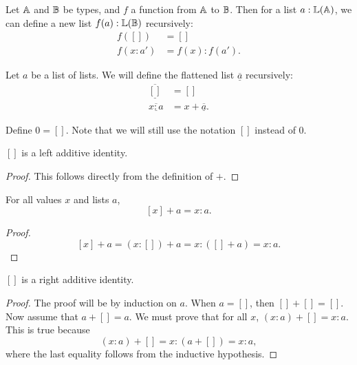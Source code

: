 \documentclass[../../math.tex]{subfiles}
\begin{document}
\begin{definition}
    Let $\mathbb{A}$ and $\mathbb{B}$ be types, and $f$ a function from $\mathbb{A}$ to $\mathbb{B}$.  Then for
    a list $a : \mathbb{L}(\mathbb{A})$, we can define a new list $f(a) : \mathbb{L}(\mathbb{B})$ recursively:
    \begin{align*}
            f([]) &= [] \\
        f(x : a') &= f(x) : f(a').
    \end{align*}
\end{definition}

\newcommand{\flatten}[1]{\underline{\overline{#1}}}
\begin{definition}
    Let $a$ be a list of lists.  We will define the flattened list $\flatten{a}$
    recursively:
    \begin{align*}
        \flatten{[]} &= [] \\
        \flatten{x : a} &= x + \flatten a.
    \end{align*}
\end{definition}

\begin{instance}
    Define $0 = []$.  Note that we will still use the notation $[]$ instead of
    $0$.
\end{instance}

\begin{instance}
    $[]$ is a left additive identity.
\end{instance}
\begin{proof}
    This follows directly from the definition of $+$.
\end{proof}

\begin{theorem}
    For all values $x$ and lists $a$,
    \[
        [x] + a = x : a.
    \]
\end{theorem}
\begin{proof}
    \[
        [x] + a = (x : []) + a = x : ([] + a) = x : a.
    \]
\end{proof}

\begin{instance}
    $[]$ is a right additive identity.
\end{instance}
\begin{proof}
    The proof will be by induction on $a$.  When $a = []$, then $[] + [] = []$.
    Now assume that $a + [] = a$.  We must prove that for all $x$, $(x : a) + []
    = x : a$.  This is true because
    \[
        (x : a) + [] = x : (a + []) = x : a,
    \]
    where the last equality follows from the inductive hypothesis.
\end{proof}
\end{document}
